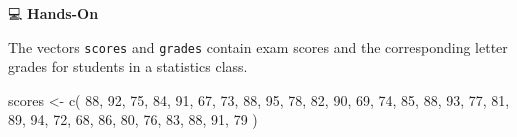 \documentclass[
  letterpaper,
  DIV=11,
  numbers=noendperiod]{scrreprt}
\newenvironment{Shaded}{\begin{snugshade}}{\end{snugshade}}
\newcommand{\DecValTok}[1]{\textcolor[rgb]{0.68,0.00,0.00}{#1}}
\newcommand{\FunctionTok}[1]{\textcolor[rgb]{0.28,0.35,0.67}{#1}}
\newcommand{\NormalTok}[1]{\textcolor[rgb]{0.00,0.23,0.31}{#1}}
\newcommand{\OtherTok}[1]{\textcolor[rgb]{0.00,0.23,0.31}{#1}}
\begin{document}
💻 \textbf{Hands-On}

The vectors \texttt{scores} and \texttt{grades} contain exam scores and
the corresponding letter grades for students in a statistics class.

\begin{Shaded}
\begin{Highlighting}[]
\NormalTok{scores }\OtherTok{\textless{}{-}} \FunctionTok{c}\NormalTok{(}
  \DecValTok{88}\NormalTok{, }\DecValTok{92}\NormalTok{, }\DecValTok{75}\NormalTok{, }\DecValTok{84}\NormalTok{, }\DecValTok{91}\NormalTok{, }\DecValTok{67}\NormalTok{, }\DecValTok{73}\NormalTok{, }\DecValTok{88}\NormalTok{, }\DecValTok{95}\NormalTok{, }\DecValTok{78}\NormalTok{,}
  \DecValTok{82}\NormalTok{, }\DecValTok{90}\NormalTok{, }\DecValTok{69}\NormalTok{, }\DecValTok{74}\NormalTok{, }\DecValTok{85}\NormalTok{, }\DecValTok{88}\NormalTok{, }\DecValTok{93}\NormalTok{, }\DecValTok{77}\NormalTok{, }\DecValTok{81}\NormalTok{, }\DecValTok{89}\NormalTok{,}
  \DecValTok{94}\NormalTok{, }\DecValTok{72}\NormalTok{, }\DecValTok{68}\NormalTok{, }\DecValTok{86}\NormalTok{, }\DecValTok{80}\NormalTok{, }\DecValTok{76}\NormalTok{, }\DecValTok{83}\NormalTok{, }\DecValTok{88}\NormalTok{, }\DecValTok{91}\NormalTok{, }\DecValTok{79}
\NormalTok{)}


\end{Highlighting}
\end{Shaded}
\end{document}
